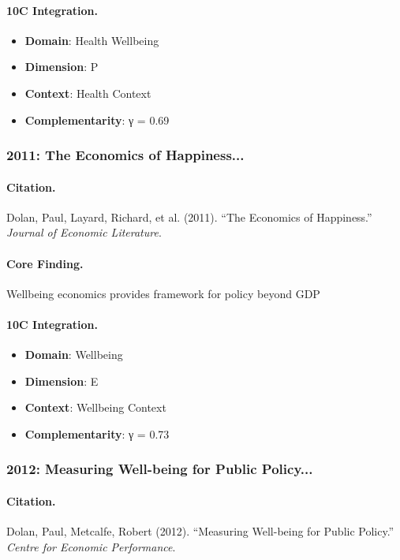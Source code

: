 \paragraph{10C Integration.}
\begin{itemize}[nosep]
  \item \textbf{Domain}: Health Wellbeing
  \item \textbf{Dimension}: P
  \item \textbf{Context}: Health Context
  \item \textbf{Complementarity}: γ = 0.69
\end{itemize}

\subsubsection{2011: The Economics of Happiness...}

\paragraph{Citation.}
Dolan, Paul, Layard, Richard, et al. (2011). ``The Economics of Happiness.''
\textit{Journal of Economic Literature}.

\paragraph{Core Finding.}
Wellbeing economics provides framework for policy beyond GDP

\paragraph{10C Integration.}
\begin{itemize}[nosep]
  \item \textbf{Domain}: Wellbeing
  \item \textbf{Dimension}: E
  \item \textbf{Context}: Wellbeing Context
  \item \textbf{Complementarity}: γ = 0.73
\end{itemize}

\subsubsection{2012: Measuring Well-being for Public Policy...}

\paragraph{Citation.}
Dolan, Paul, Metcalfe, Robert (2012). ``Measuring Well-being for Public Policy.''
\textit{Centre for Economic Performance}.


